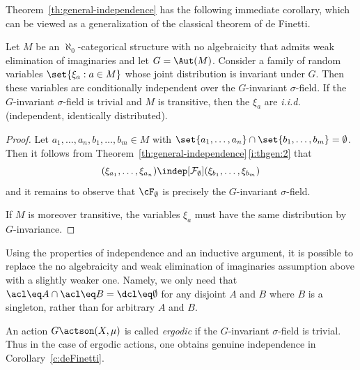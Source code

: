 Theorem~\ref{th:general-independence} has the following immediate corollary, which can be viewed as a generalization of the classical theorem of de Finetti.
\begin{cor}
\label{c:deFinetti}
Let $M$ be an $\aleph_0$-categorical structure with no algebraicity that admits weak elimination of imaginaries and let $G = \Aut(M)$. Consider a family of random variables $\set{\xi_a : a \in M}$ whose joint distribution is invariant under $G$. Then these variables are conditionally independent over the $G$-invariant $\sigma$-field. If the $G$\nobreakdash-invariant $\sigma$-field is trivial and $M$ is transitive, then the $\xi_a$ are \emph{i.i.d.} (independent, identically distributed).
\end{cor}
\begin{proof}
Let $a_1, \ldots, a_n, b_1, \ldots, b_m \in M$ with $\set{a_1, \ldots, a_n} \cap \set{b_1, \ldots, b_m} = \emptyset$. Then it follows from Theorem~\ref{th:general-independence}\,\eqref{i:thgen:2} that
\begin{equation*}
(\xi_{a_1},\ldots, \xi_{a_n}) \indep[\mathcal{F}_\emptyset] (\xi_{b_1},\ldots, \xi_{b_m})
\end{equation*}
and it remains to observe that $\cF_\emptyset$ is precisely the $G$-invariant $\sigma$-field.

If $M$ is moreover transitive, the variables $\xi_a$ must have the same distribution by $G$-invariance.
\end{proof}

\begin{remark}
\label{rem:dF-weaker-assumption}
Using the properties of independence and an inductive argument, it is possible to replace the no algebraicity and weak elimination of imaginaries assumption above with a slightly weaker one. Namely, we only need that $\acl\eq A \cap \acl\eq B = \dcl\eq \emptyset$ for any disjoint $A$ and $B$ where $B$ is a singleton, rather than for arbitrary $A$ and $B$.
\end{remark}

An action $G \actson (X, \mu)$ is called \emph{ergodic} if the $G$-invariant $\sigma$-field is trivial. Thus in the case of ergodic actions, one obtains genuine independence in Corollary~\ref{c:deFinetti}.

